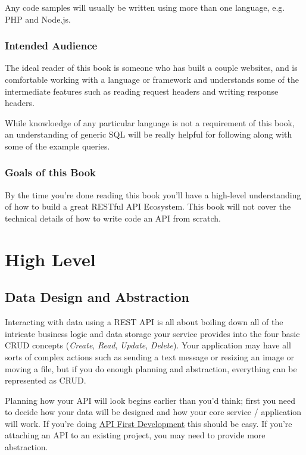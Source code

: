 \documentclass{book}
\begin{document}
Any code samples will usually be written using more than one language, e.g. PHP and Node.js.

\subsection{Intended Audience}

The ideal reader of this book is someone who has built a couple websites, and is comfortable working with a language or framework and understands some of the intermediate features such as reading request headers and writing response headers.

While knowloedge of any particular language is not a requirement of this book, an understanding of generic SQL will be really helpful for following along with some of the example queries.

\subsection{Goals of this Book}

By the time you're done reading this book you'll have a high-level understanding of how to build a great RESTful API Ecosystem. This book will not cover the technical details of how to write code an API from scratch.


\chapter{High Level}

\section{Data Design and Abstraction}

Interacting with data using a REST API is all about boiling down all of the intricate business logic and data storage your service provides into the four basic CRUD concepts (\emph{Create}, \emph{Read}, \emph{Update}, \emph{Delete}). Your application may have all sorts of complex actions such as sending a text message or resizing an image or moving a file, but if you do enough planning and abstraction, everything can be represented as CRUD.

Planning how your API will look begins earlier than you'd think; first you need to decide how your data will be designed and how your core service / application will work. If you're doing \href{http://blog.pop.co/post/67465239611/why-we-chose-api-first-development}{API First Development} this should be easy. If you're attaching an API to an existing project, you may need to provide more abstraction.
\end{document}
